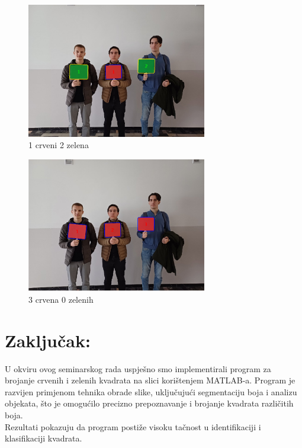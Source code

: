 \documentclass[a4paper,12pt]{article}
\begin{document}
\begin{figure}[htbp]
    \centering
    \includegraphics[width=0.7\textwidth]{img/kolege_2_crop.png}
    \caption{1 crveni 2 zelena}
    \label{fig:example}
\end{figure}


\begin{figure}[htbp]
    \centering
    \includegraphics[width=0.7\textwidth]{img/kolege_3_crop.png}
    \caption{3 crvena 0 zelenih}
    \label{fig:example}
\end{figure}
\newpage
\section{Zaključak:}
U okviru ovog seminarskog rada uspješno smo implementirali program za brojanje crvenih i zelenih kvadrata na slici korištenjem MATLAB-a. Program je razvijen primjenom tehnika obrade slike, uključujući segmentaciju boja i analizu objekata, što je omogućilo precizno prepoznavanje i brojanje kvadrata različitih boja.
\\

Rezultati pokazuju da program postiže visoku tačnost u identifikaciji i klasifikaciji kvadrata.
\\
\end{document}
